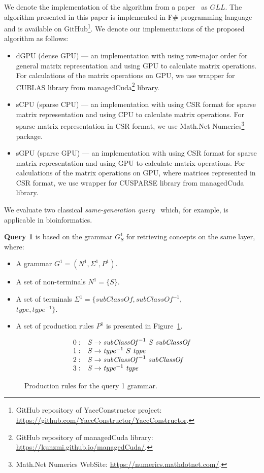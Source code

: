 We denote the implementation of the algorithm from a paper~\cite{GLL} as $GLL$. The algorithm presented in this paper is implemented in F\# programming language~\cite{fsharp} and is available on GitHub\footnote{GitHub repository of YaccConstructor project: \url{https://github.com/YaccConstructor/YaccConstructor}.}. We denote our implementations of the proposed algorithm as follows:
\begin{itemize}
    \item dGPU (dense GPU) --- an implementation with using row-major order for general matrix representation and using GPU to calculate matrix operations. For calculations of the matrix operations on GPU, we use wrapper for CUBLAS library from managedCuda\footnote{GitHub repository of managedCuda library: \url{https://kunzmi.github.io/managedCuda/}.} library.
    \item sCPU (sparse CPU) --- an implementation with using CSR format for sparse matrix representation and using CPU to calculate matrix operations. For sparse matrix representation in CSR format, we use Math.Net Numerics\footnote{Math.Net Numerics WebSite: \url{https://numerics.mathdotnet.com/}.} package.
    \item sGPU (sparse GPU) --- an implementation with using CSR format for sparse matrix representation and using GPU to calculate matrix operations. For calculations of the matrix operations on GPU, where matrices represented in CSR format, we use wrapper for CUSPARSE library from managedCuda library.
\end{itemize}

We evaluate two classical \textit{same-generation query}~\cite{FndDB} which, for example, is applicable in bioinformatics.

\textbf{Query 1} is based on the grammar $G^1_S$ for retrieving concepts on the same layer, where:
\begin{itemize}
    \item A grammar $G^1 = (N^1, \Sigma^1, P^1)$.
    \item A set of non-terminals $N^1 = \{S\}$.
    \item A set of terminals $\Sigma^1 = \{subClassOf, subClassOf^{-1},$ \\ $type, type^{-1}\}$.
    \item A set of production rules $P^1$ is presented in Figure~\ref{ProductionRulesQuery1}.
\end{itemize}

\begin{figure}[h]
   \[
\begin{array}{rl}
   0: & S \rightarrow \text{\textit{subClassOf}}^{-1} \ S \ \text{\textit{subClassOf}} \\ 
   1: & S \rightarrow \text{\textit{type}}^{-1} \ S \ \text{\textit{type}} \\ 
   2: & S \rightarrow \text{\textit{subClassOf}}^{-1} \ \text{\textit{subClassOf}} \\ 
   3: & S \rightarrow \text{\textit{type}}^{-1} \ \text{\textit{type}} \\ 
\end{array}
\]
\caption{Production rules for the query 1 grammar.}
\label{ProductionRulesQuery1}
\end{figure}

